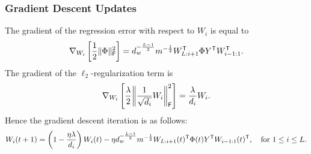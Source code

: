 \subsubsection{Gradient Descent Updates}
\label{sec:subsec:subsubsec:gd-updates}
The gradient of the regression error with respect to $W_{i}$ is equal to
\begin{equation}
	\nabla_{W_i} \left[\frac{1}{2}\lVert\Phi\rVert_{\mathsf{F}}^2 \right]
	= d_w^{-\frac{L-1}{2}}m^{-\frac{1}{2}} W_{L:i+1}^{\mathsf{T}} \Phi Y^{\mathsf{T}} W_{i-1:1}^{\mathsf{T}}.
	\label{eq:mse-gradient}
\end{equation}
The gradient of the $\ell_2$-regularization term is
\begin{equation}
	\grad_{W_i} \left[ \frac{\lambda}{2}\frobnorm*{\frac{1}{\sqrt{d_i}}W_i}^2 \right]
	= \frac{\lambda}{d_i} W_i.
\end{equation}
Hence the gradient descent iteration is as follows:
\begin{equation}
	W_i(t+1)
	= \left(1-\frac{\eta\lambda}{d_i}\right) W_i(t) - \eta
	d_w^{-\frac{L-1}{2}}m^{-\frac{1}{2}} W_{L:i+1}(t)^{\mathsf{T}} \Phi(t) Y^{\mathsf{T}} W_{i-1:1}(t)^{\mathsf{T}},
  \quad \text{for $1 \leq i \leq L$.}
	\label{eq:Wi-update}
\end{equation}

